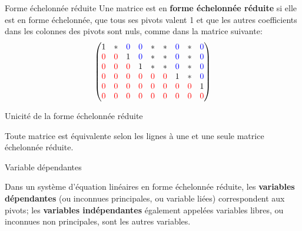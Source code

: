 \documentclass[french]{beamer}
\begin{document}
\begin{frame}{Forme échelonnée réduite}
Une matrice est en \textbf{forme échelonnée réduite} si elle est en forme échelonnée,
que tous ses pivots valent 1 et que les autres coefficients dans les colonnes des
pivots sont nuls, comme dans la matrice suivante:
\[
\begin{pmatrix}
1 & * & {\color{blue}{0}} & {\color{blue}{0}} & * & * & {\color{blue}{0}} & * & {\color{blue}{0}}  \\
{\color{red}{0}} & {\color{red}{0}} & 1 & {\color{blue}{0}} & * & * & {\color{blue}{0}} & * & {\color{blue}{0}}  \\
{\color{red}{0}} & {\color{red}{0}} & {\color{red}{0}} & 1 & * & * & {\color{blue}{0}} & * & {\color{blue}{0}}  \\ 
{\color{red}{0}} & {\color{red}{0}} & {\color{red}{0}} & {\color{red}{0}} & {\color{red}{0}} & {\color{red}{0}} & 1 & * & {\color{blue}{0}}  \\ 
{\color{red}{0}} & {\color{red}{0}} & {\color{red}{0}} & {\color{red}{0}} & {\color{red}{0}} & {\color{red}{0}} & {\color{red}{0}} & {\color{red}{0}} & 1  \\ 
{\color{red}{0}} & {\color{red}{0}} & {\color{red}{0}} & {\color{red}{0}} & {\color{red}{0}} & {\color{red}{0}} & {\color{red}{0}} & {\color{red}{0}} & {\color{red}{0}}  
\end{pmatrix}
\]

\end{frame}
	
\begin{frame}{Unicité de la forme échelonnée réduite}
\begin{theorem}
	Toute matrice est équivalente selon les lignes à une et une seule matrice échelonnée réduite.
\end{theorem}

\end{frame}


\begin{frame}{Variable dépendantes}
\begin{definition}
Dans un système d'équation linéaires en forme échelonnée réduite, les \textbf{variables dépendantes}
(ou inconnues principales, ou variable liées)
correspondent aux pivots; les \textbf{variables indépendantes} également appelées
variables libres, ou inconnues non principales, sont les autres variables.  
\end{definition}

\end{frame}
\end{document}

